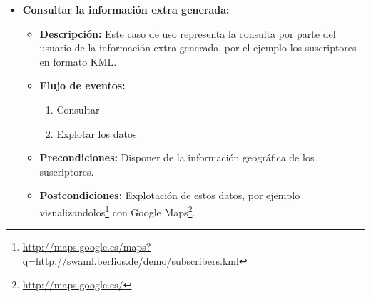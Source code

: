 \begin{itemize}
  \item \textbf{Consultar la información extra generada:}
 	\begin{itemize}
 	  \item \textbf{Descripción:} Este caso de uso representa la consulta 
		por parte del usuario de la información extra generada, por el 
		ejemplo los suscriptores en formato KML.
 	  \item \textbf{Flujo de eventos:}
		\begin{enumerate}
		 \item Consultar
		 \item Explotar los datos
		\end{enumerate}
	  \item \textbf{Precondiciones:} Disponer de la información geográfica 
		de los suscriptores.
	  \item \textbf{Postcondiciones:} Explotación de estos datos, por ejemplo
		visualizandolos\footnote{\url{http://maps.google.es/maps?q=http://swaml.berlios.de/demo/subscribers.kml}}
		con Google Maps\footnote{\url{http://maps.google.es/}}.
	\end{itemize}

\end{itemize}



